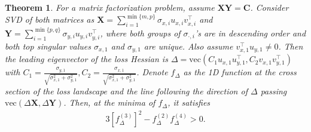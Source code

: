 \documentclass{article}
\theoremstyle{plain}
\newtheorem{theorem}{Theorem}
\theoremstyle{remark}
\begin{document}
\begin{theorem}
    For a matrix factorization problem, assume $\mathbf{X}\mathbf{Y}=\mathbf{C}$.
    Consider SVD of both matrices as $\mathbf{X} = \sum_{i=1}^{\min\{m,p\}} \sigma_{x,i} u_{x,i} v_{x,i}^\top$ and $\mathbf{Y} = \sum_{i=1}^{\min\{p,q\}} \sigma_{y,i} u_{y,i} v_{y,i}^\top$, where both groups of $\sigma_{\cdot,i}$'s are in descending order and both top singular values $\sigma_{x,1}$ and $\sigma_{y,1}$ are unique. Also assume $v_{x,1}^\top u_{y,1}\neq 0$. Then the leading eigenvector of the loss Hessian is $\Delta=\text{vec}(C_1 u_{x,1}u_{y,1}^\top, C_2 v_{x,1}v_{y,1}^\top)$ with $C_1=\frac{\sigma_{y,1}}{\sqrt{\sigma_{x,1}^2+\sigma_{y,1}^2}}, C_2=\frac{\sigma_{x,1}}{\sqrt{\sigma_{x,1}^2+\sigma_{y,1}^2}}$. Denote $f_\Delta$ as the 1D function at the cross section of the loss landscape and the line following the direction of $\Delta$ passing $\text{vec}(\Delta\mathbf{X}, \Delta\mathbf{Y})$. Then, at the minima of $f_\Delta$, it satisfies
    \begin{align}
        3[f_\Delta^{(3)}]^2 - f_\Delta^{(2)}f_\Delta^{(4)}>0.
    \end{align}
\end{theorem}
\end{document}
